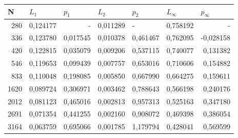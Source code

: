 \documentclass[14pt]{article}
\begin{document}
\newpage
\begin{table}[!h!]
\begin{tabular}{|r|r|r|r|r|r|r|}
\hline
\multicolumn{1}{|l|}{N} & \multicolumn{1}{l|}{$L_1$}        & \multicolumn{1}{l|}{$p_1$} & \multicolumn{1}{l|}{$L_2$}     & \multicolumn{1}{l|}{$p_2$} & \multicolumn{1}{l|}{$L_\infty$} & \multicolumn{1}{l|}{$p_\infty$} \\ \hline
280                     & 0,124177                         & -                         & 0,011289                      & \multicolumn{1}{l|}{-}    & 0,758192                    & -                           \\ \hline
336                     & 0,123780                         & 0,017545                  & 0,010378                      & 0,461467                  & 0,762095                    & -0,028158                   \\ \hline
420                     & 0,122815                         & 0,035079                  & 0,009206                      & 0,537115                  & 0,740077                    & 0,131382                    \\ \hline
546                     & 0,119653                         & 0,099439                  & 0,007757                      & 0,653016                  & 0,710606                    & 0,154882                    \\ \hline
833                     & 0,110048                         & 0,198085                  & 0,005850                      & 0,667990                  & 0,664275                    & 0,159611                    \\ \hline
1620                    & 0,089724                         & 0,306971                  & 0,003462                      & 0,788643                  & 0,566198                    & 0,240176                    \\ \hline
2012                    & 0,081123                         & 0,465016                  & 0,002813                      & 0,957313                  & 0,525163                    & 0,347180                    \\ \hline
2691                    & 0,071354                         & 0,441255                  & 0,002160                      & 0,908072                  & 0,469398                    & 0,386054                    \\ \hline
3164                    & 0,063759                         & 0,695066                  & 0,001785                      & 1,179794                  & 0,428041                    & 0,569599                    \\ \hline

\end{tabular}
\end{table}
\end{document}

